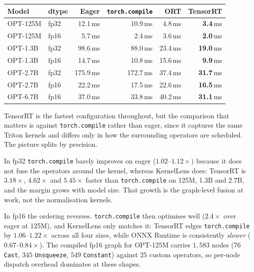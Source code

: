 \documentclass[10pt]{article}
\begin{document}
\begin{center}
\footnotesize
\begin{tabular}{llrrrr}
\toprule
Model & dtype & Eager & \texttt{torch.compile} & ORT & TensorRT \\
\midrule
OPT-125M & fp32 & 12.1\,ms & 10.9\,ms & 4.8\,ms & \textbf{3.4}\,ms \\
OPT-125M & fp16 & 5.7\,ms & 2.4\,ms & 3.6\,ms & \textbf{2.0}\,ms \\
OPT-1.3B & fp32 & 98.6\,ms & 88.0\,ms & 23.4\,ms & \textbf{19.0}\,ms \\
OPT-1.3B & fp16 & 14.7\,ms & 10.8\,ms & 15.6\,ms & \textbf{9.9}\,ms \\
OPT-2.7B & fp32 & 175.9\,ms & 172.7\,ms & 37.4\,ms & \textbf{31.7}\,ms \\
OPT-2.7B & fp16 & 22.2\,ms & 17.5\,ms & 22.6\,ms & \textbf{16.5}\,ms \\
OPT-6.7B & fp16 & 37.0\,ms & 33.8\,ms & 40.2\,ms & \textbf{31.1}\,ms \\
\bottomrule
\end{tabular}
\label{tab:real}
\end{center}

TensorRT is the fastest configuration throughout, but the comparison that
matters is against \texttt{torch.compile} rather than eager, since it captures
the same Triton kernels and differs only in how the surrounding operators are
scheduled. The picture splits by precision.

In fp32 \texttt{torch.compile} barely improves on eager ($1.02$--$1.12\times$)
because it does not fuse the operators around the kernel, whereas KernelLens
does: TensorRT is $3.18\times$, $4.62\times$ and $5.45\times$ faster than
\texttt{torch.compile} on 125M, 1.3B and 2.7B, and the margin grows with model
size. That growth is the graph-level fusion at work, not the normalisation
kernels.

In fp16 the ordering reverses. \texttt{torch.compile} then optimises well
($2.4\times$ over eager at 125M), and KernelLens only matches it: TensorRT
edges \texttt{torch.compile} by $1.06$--$1.22\times$ across all four sizes,
while ONNX Runtime is consistently \emph{slower} ($0.67$--$0.84\times$). The
compiled fp16 graph for OPT-125M carries $1{,}583$ nodes ($76$ \texttt{Cast},
$345$ \texttt{Unsqueeze}, $549$ \texttt{Constant}) against $25$ custom
operators, so per-node dispatch overhead dominates at these shapes.
\end{document}
